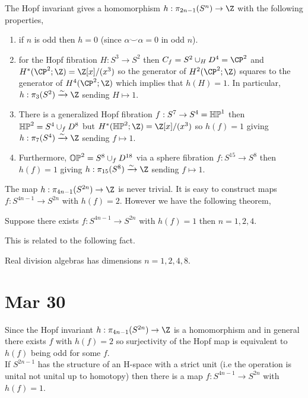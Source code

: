 \documentclass[12pt]{extarticle}
\begin{document}
\begin{prop}
The Hopf invariant gives a homomorphism $h : \pi_{2n - 1}(S^n) \to \Z$ with the following properties,
\begin{enumerate}
\item if $n$ is odd then $h = 0$ (since $\alpha \smile \alpha = 0$ in odd $n$).
\item for the Hopf fibration $H : S^3 \to S^2$ then $C_f = S^2 \cup_H D^4 = \CP^2$ and $H^*(\CP^2; \Z) = \Z[x]/(x^3)$ so the generator of $H^2(\CP^2; \Z)$ squares to the generator of $H^4(\CP^2; \Z)$ which implies that $h(H) = 1$. In particular, $h : \pi_3(S^2) \xrightarrow{\sim} \Z$ sending $H \mapsto 1$. 
\item There is a generalized Hopf fibration $f : S^7 \to S^4 = \mathbb{HP}^1$ then $\mathbb{HP}^2 = S^4 \cup_f D^8$ but $H^*(\HP^2; \Z) = \Z[x]/(x^3)$ so $h(f) = 1$ giving $h : \pi_7(S^4) \xrightarrow{\sim} \Z$ sending $f \mapsto 1$.
\item Furthermore, $\mathbb{OP}^2 = S^8 \cup_f D^{18}$ via a sphere fibration $f : S^{15} \to S^8$ then $h(f) = 1$ giving $h : \pi_{15}(S^8) \xrightarrow{\sim} \Z$ sending $f \mapsto 1$.
\end{enumerate}
\end{prop}

\begin{rmk}
The map $h : \pi_{4n-1}(S^{2n}) \to \Z$ is never trivial. It is easy to construct maps $f : S^{4n - 1} \to S^{2n}$ with $h(f) = 2$. However we have the following theorem,
\end{rmk}

\begin{theorem}[Adams]
Suppose there exists $f : S^{4n - 1} \to S^{2n}$ with $h(f) = 1$ then $n = 1, 2, 4$. 
\end{theorem}

\begin{rmk}
This is related to the following fact.
\end{rmk}

\begin{theorem}
Real division algebras has dimensions $n = 1,2,4,8$. 
\end{theorem}

\section{Mar 30}

Since the Hopf invariant $h : \pi_{4n - 1}(S^{2n}) \to \Z$ is a homomorphism and in general there exists $f$ with $h(f) = 2$ so surjectivity of the Hopf map is equivalent to $h(f)$ being odd for some $f$. 
\bigskip\\
If $S^{2n-1}$ has the structure of an H-space with a strict unit (i.e the operation is unital not unital up to homotopy) then there is a map $f : S^{4n - 1} \to S^{2n}$ with $h(f) = 1$. 
\end{document}
